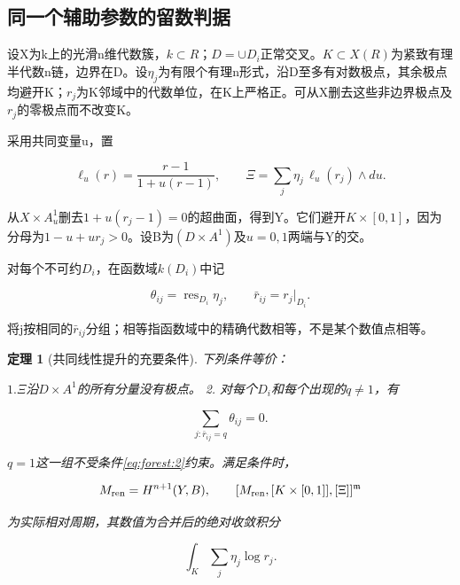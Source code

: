 \documentclass[11pt,a4paper,oneside]{ctexart}
\theoremstyle{cnplain}
\newtheorem{theorem}{定理}[section]
\theoremstyle{definition}
\theoremstyle{remark}
\numberwithin{equation}{section}
\begin{document}
\endgroup



\begingroup

\subsection{同一个辅助参数的留数判据}\label{sec:forest:1}

设X为k上的光滑n维代数簇，\(k\subset R\)；\(D=\cup D_i\)正常交叉。\(K\subset X(R)\)为紧致有理半代数n链，边界在D。设\(\eta _j\)为有限个有理n形式，沿D至多有对数极点，其余极点均避开K；\(r_j\)为K邻域中的代数单位，在K上严格正。可从X删去这些非边界极点及\(r_j\)的零极点而不改变K。

采用共同变量u，置

\begin{equation}
\ell_u(r)=\frac{r-1}{1+u(r-1)},\qquad
 \Xi=\sum_j\eta_j\,\ell_u(r_j)\wedge du.                         \label{eq:forest:1}
\end{equation}

从\(X\times A^{1}_u\)删去\(1+u(r_j- 1)=0\)的超曲面，得到Y。它们避开\(K\times [0,1]\)，因为分母为\(1- u+ur_j>0\)。设B为\((D\times A^{1})\)及\(u=0,1\)两端与Y的交。

对每个不可约\(D_i\)，在函数域\(k(D_i)\)中记

\begin{equation}
\theta_{ij}=\operatorname{res}_{D_i}\eta_j,\qquad
 \bar r_{ij}=r_j|_{D_i}.
\end{equation}

将j按相同的\(\bar r_{ij}\)分组；相等指函数域中的精确代数相等，不是某个数值点相等。

\begin{theorem}[共同线性提升的充要条件]

\label{thm:forest:1.1} 下列条件等价：

\(1. \Xi \)沿\(D\times A^{1}\)的所有分量没有极点。 2. 对每个\(D_i\)和每个出现的\(q\ne 1\)，有

\begin{equation}
\sum_{j:\bar r_{ij}=q}\theta_{ij}=0.          \label{eq:forest:2}
\end{equation}

\(q=1\)这一组不受条件\eqref{eq:forest:2}约束。满足条件时，

\begin{equation}
M_{\rm ren}=H^{n+1}(Y,B),\qquad
 [M_{\rm ren},[K\times[0,1]],[\Xi]]^{\mathfrak m}                \label{eq:forest:3}
\end{equation}

为实际相对周期，其数值为合并后的绝对收敛积分

\begin{equation}
\int_K\sum_j\eta_j\log r_j.                                    \label{eq:forest:4}
\end{equation}

\end{theorem}
\end{document}
